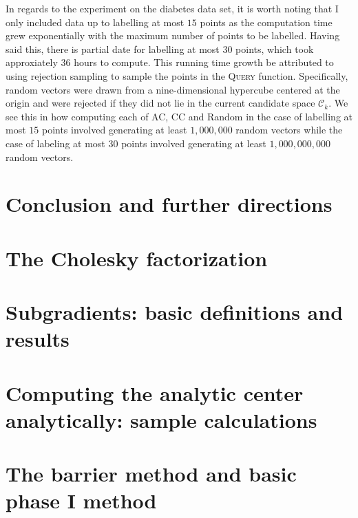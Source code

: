 \documentclass[11pt]{amsart}
\theoremstyle{definition}
\theoremstyle{remark}
\begin{document}
        In regards to the experiment on the diabetes data set, it is worth noting that I only included data up to labelling at most $15$ points as the computation time grew exponentially with the maximum number of points to be labelled. Having said this, there is partial date for labelling at most $30$ points, which took approxiately $36$ hours to compute. This running time growth be attributed to using rejection sampling to sample the points in the \textsc{Query} function. Specifically, random vectors were drawn from a nine-dimensional hypercube centered at the origin and were rejected if they did not lie in the current candidate space $\mathcal{C}_k$. We see this in how computing each of AC, CC and Random in the case of labelling at most $15$ points involved generating at least $1, 000, 000$ random vectors while the case of labeling at most $30$ points involved generating at least $1, 000, 000, 000$ random vectors.

\section{Conclusion and further directions}\label{s:conc}


\appendix

\section{The Cholesky factorization}\label{a:cholesky}

\section{Subgradients: basic definitions and results}\label{a:subgrad}

\section{Computing the analytic center analytically: sample calculations}\label{a:sample}

\section{The barrier method and basic phase I method}\label{a:barrier}
\end{document}

